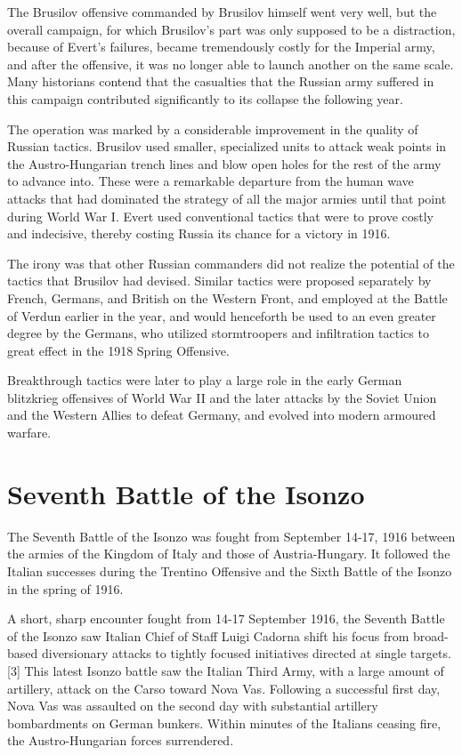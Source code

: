 \documentclass[a4paper,]{book}
\begin{document}
The Brusilov offensive commanded by Brusilov himself went very well, but the overall campaign, for which Brusilov's part was only supposed to be a distraction, because of Evert's failures, became tremendously costly for the Imperial army, and after the offensive, it was no longer able to launch another on the same scale. Many historians contend that the casualties that the Russian army suffered in this campaign contributed significantly to its collapse the following year.

The operation was marked by a considerable improvement in the quality of Russian tactics. Brusilov used smaller, specialized units to attack weak points in the Austro-Hungarian trench lines and blow open holes for the rest of the army to advance into. These were a remarkable departure from the human wave attacks that had dominated the strategy of all the major armies until that point during World War I. Evert used conventional tactics that were to prove costly and indecisive, thereby costing Russia its chance for a victory in 1916.

The irony was that other Russian commanders did not realize the potential of the tactics that Brusilov had devised. Similar tactics were proposed separately by French, Germans, and British on the Western Front, and employed at the Battle of Verdun earlier in the year, and would henceforth be used to an even greater degree by the Germans, who utilized stormtroopers and infiltration tactics to great effect in the 1918 Spring Offensive.

Breakthrough tactics were later to play a large role in the early German blitzkrieg offensives of World War II and the later attacks by the Soviet Union and the Western Allies to defeat Germany, and evolved into modern armoured warfare.

\section{Seventh Battle of the Isonzo}

The Seventh Battle of the Isonzo was fought from September 14-17, 1916 between the armies of the Kingdom of Italy and those of Austria-Hungary. It followed the Italian successes during the Trentino Offensive and the Sixth Battle of the Isonzo in the spring of 1916.

A short, sharp encounter fought from 14-17 September 1916, the Seventh Battle of the Isonzo saw Italian Chief of Staff Luigi Cadorna shift his focus from broad-based diversionary attacks to tightly focused initiatives directed at single targets.[3] This latest Isonzo battle saw the Italian Third Army, with a large amount of artillery, attack on the Carso toward Nova Vas. Following a successful first day, Nova Vas was assaulted on the second day with substantial artillery bombardments on German bunkers. Within minutes of the Italians ceasing fire, the Austro-Hungarian forces surrendered.
\end{document}
